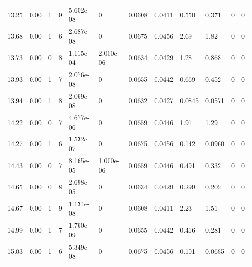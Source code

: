 \documentclass[preview]{standalone}
\begin{document}
{{{{\begin{tabular}{L{1.2cm}C{1.2cm} C{0.3cm}C{0.5cm} C{1.4cm}C{1.4cm} C{1.4cm}C{1.4cm} C{1.6cm}C{1.6cm} C{1.6cm}C{1.6cm}}
  13.25  &  0.00  & 1     &  9 &  5.602e-08  & 0  &  0.0608&   0.0411& 0.550 & 0.371   &  0 & 0  \\ 
  13.68  &  0.00  & 1     &  6 &  2.687e-08  & 0  &  0.0675&   0.0456& 2.69 & 1.82   &  0 & 0  \\ 
  13.73  &  0.00  & 0     &  8 &  1.115e-04  & 2.000e-06  &  0.0634&   0.0429& 1.28 & 0.868   &  0 & 0  \\ 
  13.93  &  0.00  & 1     &  7 &  2.076e-08  & 0  &  0.0655&   0.0442& 0.669 & 0.452   &  0 & 0  \\ 
  13.94  &  0.00  & 1     &  8 &  2.069e-08  & 0  &  0.0632&   0.0427& 0.0845 & 0.0571   &  0 & 0  \\ 
  14.22  &  0.00  & 0     &  7 &  4.677e-06  & 0  &  0.0659&   0.0446& 1.91 & 1.29   &  0 & 0  \\ 
  14.27  &  0.00  & 1     &  6 &  1.532e-07  & 0  &  0.0675&   0.0456& 0.142 & 0.0960   &  0 & 0  \\ 
  14.43  &  0.00  & 0     &  7 &  8.165e-05  & 1.000e-06  &  0.0659&   0.0446& 0.491 & 0.332   &  0 & 0  \\ 
  14.65  &  0.00  & 0     &  8 &  2.698e-05  & 0  &  0.0634&   0.0429& 0.299 & 0.202   &  0 & 0  \\ 
  14.67  &  0.00  & 1     &  9 &  1.134e-08  & 0  &  0.0608&   0.0411& 2.23 & 1.51   &  0 & 0  \\ 
  14.99  &  0.00  & 1     &  7 &  1.760e-09  & 0  &  0.0655&   0.0442& 0.416 & 0.281   &  0 & 0  \\ 
  15.03  &  0.00  & 1     &  6 &  5.349e-08  & 0  &  0.0675&   0.0456& 0.101 & 0.0685   &  0 & 0  \\ 
\hline 
\end{tabular} 

}}}}
\end{document}
